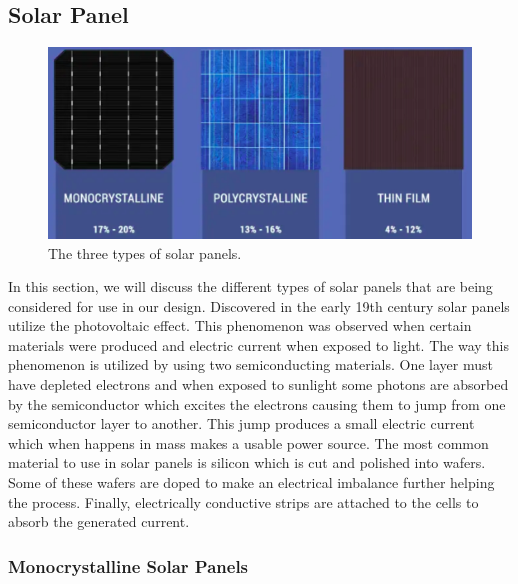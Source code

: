 \subsection{Solar Panel}

\begin{figure}
    \centering
    \includegraphics[scale=0.4]{figures/solar panel overview.png}
    \caption{The three types of solar panels.}
    \label{solar-panel-overview} 
\end{figure}

In this section, we will discuss the different types of solar panels that are being considered for use in our design. Discovered in the early 19th century solar panels utilize the photovoltaic effect. This phenomenon was observed when certain materials were produced and electric current when exposed to light. The way this phenomenon is utilized by using two semiconducting materials. One layer must have depleted electrons and when exposed to sunlight some photons are absorbed by the semiconductor which excites the electrons causing them to jump from one semiconductor layer to another. This jump produces a small electric current which when happens in mass makes a usable power source. The most common material to use in solar panels is silicon which is cut and polished into wafers. Some of these wafers are doped to make an electrical imbalance further helping the process. Finally, electrically conductive strips are attached to the cells to absorb the generated current. 

\subsubsection{Monocrystalline Solar Panels}

